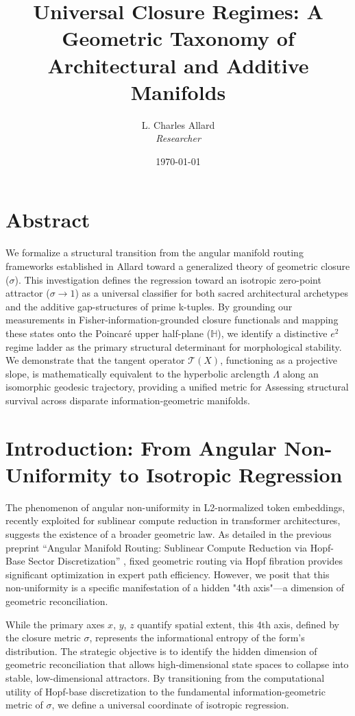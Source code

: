 \documentclass[12pt]{article}
\title{Universal Closure Regimes: A Geometric Taxonomy of Architectural and Additive Manifolds}
\author{L. Charles Allard \\ \textit{Researcher}}
\date{\today}
\begin{document}
\maketitle

\section{Abstract}
We formalize a structural transition from the angular manifold routing frameworks established in Allard \cite{allard2026angular} toward a generalized theory of geometric closure ($\sigma$). This investigation defines the regression toward an isotropic zero-point attractor ($\sigma \to 1$) as a universal classifier for both sacred architectural archetypes and the additive gap-structures of prime k-tuples. By grounding our measurements in Fisher-information-grounded closure functionals and mapping these states onto the Poincaré upper half-plane ($\mathbb{H}$), we identify a distinctive $e^2$ regime ladder as the primary structural determinant for morphological stability. We demonstrate that the tangent operator $\mathcal{T}(X)$, functioning as a projective slope, is mathematically equivalent to the hyperbolic arclength $\Lambda$ along an isomorphic geodesic trajectory, providing a unified metric for Assessing structural survival across disparate information-geometric manifolds.

\section{Introduction: From Angular Non-Uniformity to Isotropic Regression}
The phenomenon of angular non-uniformity in L2-normalized token embeddings, recently exploited for sublinear compute reduction in transformer architectures, suggests the existence of a broader geometric law. As detailed in the previous preprint ``Angular Manifold Routing: Sublinear Compute Reduction via Hopf-Base Sector Discretization'' \cite{allard2026angular}, fixed geometric routing via Hopf fibration provides significant optimization in expert path efficiency. However, we posit that this non-uniformity is a specific manifestation of a hidden "4th axis"—a dimension of geometric reconciliation.

While the primary axes $x$, $y$, $z$ quantify spatial extent, this 4th axis, defined by the closure metric $\sigma$, represents the informational entropy of the form’s distribution. The strategic objective is to identify the hidden dimension of geometric reconciliation that allows high-dimensional state spaces to collapse into stable, low-dimensional attractors. By transitioning from the computational utility of Hopf-base discretization to the fundamental information-geometric metric of $\sigma$, we define a universal coordinate of isotropic regression.
\end{document}
